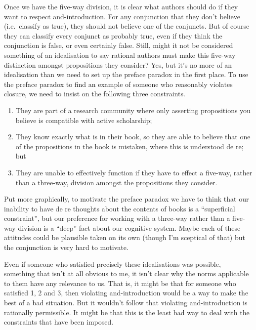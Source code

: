 \documentclass[11pt,]{book}
\providecommand{\tightlist}{%
  \setlength{\itemsep}{0pt}\setlength{\parskip}{0pt}}
\begin{document}
Once we have the five-way division, it is clear what authors should do if they want to respect and-introduction. For any conjunction that they don't believe (i.e.~classify as true), they should not believe one of the conjuncts. But of course they can classify every conjunct as probably true, even if they think the conjunction is false, or even certainly false. Still, might it not be considered something of an idealisation to say rational authors must make this five-way distinction amongst
propositions they consider? Yes, but it's no more of an idealisation than we need to set up the preface paradox in the first place. To use the preface paradox to find an example of someone who reasonably violates closure, we need to insist on the following three constraints.

\begin{enumerate}
\def\labelenumi{\arabic{enumi}.}
\tightlist
\item
  They are part of a research community where only asserting propositions you believe is compatible with active scholarship;
\item
  They know exactly what is in their book, so they are able to believe that one of the propositions in the book is mistaken, where this is understood de re; but
\item
  They are unable to effectively function if they have to effect a five-way, rather than a three-way, division amongst the propositions they consider.
\end{enumerate}

Put more graphically, to motivate the preface paradox we have to think that our inability to have de re thoughts about the contents of books is a ``superficial constraint'', but our preference for working with a three-way rather than a five-way division is a ``deep'' fact about our cognitive system. Maybe each of these attitudes could be plausible taken on its own (though I'm sceptical of that) but the conjunction is very hard to motivate.

Even if someone who satisfied precisely these idealisations was possible, something that isn't at all obvious to me, it isn't clear why the norms applicable to them have any relevance to us. That is, it might be that for someone who satisfied 1, 2 and 3, then violating and-introduction would be a way to make the best of a bad situation. But it wouldn't follow that violating and-introduction is rationally permissible. It might be that this is the least bad way to deal with the constraints that have been imposed.
\end{document}
